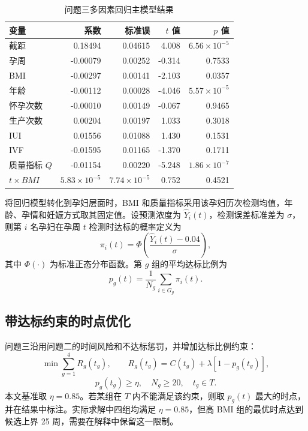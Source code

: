 \documentclass[UTF8,zihao=-4]{ctexart}
\numberwithin{equation}{section}
\begin{document}
\begin{table}[H]
\centering
\caption{问题三多因素回归主模型结果}
\label{tab:q3reg}
\begin{tabular}{lrrrr}
\toprule
变量 & 系数 & 标准误 & $t$ 值 & $p$ 值 \\
\midrule
截距 & 0.18494 & 0.04615 & 4.008 & $6.56\times10^{-5}$ \\
孕周 & -0.00079 & 0.00252 & -0.314 & 0.7533 \\
BMI & -0.00297 & 0.00141 & -2.103 & 0.0357 \\
年龄 & -0.00112 & 0.00028 & -4.046 & $5.57\times10^{-5}$ \\
怀孕次数 & -0.00010 & 0.00149 & -0.067 & 0.9465 \\
生产次数 & 0.00204 & 0.00197 & 1.033 & 0.3018 \\
IUI & 0.01556 & 0.01088 & 1.430 & 0.1531 \\
IVF & -0.01595 & 0.01165 & -1.370 & 0.1711 \\
质量指标 $Q$ & -0.01154 & 0.00220 & -5.248 & $1.86\times10^{-7}$ \\
$t\times BMI$ & $5.83\times10^{-5}$ & $7.74\times10^{-5}$ & 0.752 & 0.4521 \\
\bottomrule
\end{tabular}
\end{table}

将回归模型转化到孕妇层面时，BMI 和质量指标采用该孕妇历次检测均值，年龄、孕情和妊娠方式取其固定值。设预测浓度为 $\hat{Y}_i(t)$，检测误差标准差为 $\sigma$，则第 $i$ 名孕妇在孕周 $t$ 检测时达标的概率定义为
\begin{equation}
\pi_i(t)=\Phi\left(\frac{\hat{Y}_i(t)-0.04}{\sigma}\right),
\end{equation}
其中 $\Phi(\cdot)$ 为标准正态分布函数。第 $g$ 组的平均达标比例为
\begin{equation}
p_g(t)=\frac{1}{N_g}\sum_{i\in G_g}\pi_i(t).
\end{equation}

\subsection{带达标约束的时点优化}

问题三沿用问题二的时间风险和不达标惩罚，并增加达标比例约束：
\begin{equation}
\min \sum_{g=1}^{4}R_g(t_g),\qquad
R_g(t_g)=C(t_g)+\lambda[1-p_g(t_g)],
\end{equation}
\begin{equation}
p_g(t_g)\ge \eta,\quad N_g\ge 20,\quad t_g\in T.
\end{equation}
本文基准取 $\eta=0.85$。若某组在 $T$ 内不能满足该约束，则取 $p_g(t)$ 最大的时点，并在结果中标注。实际求解中四组均满足 $\eta=0.85$，但高 BMI 组的最优时点达到候选上界 25 周，需要在解释中保留这一限制。
\end{document}
